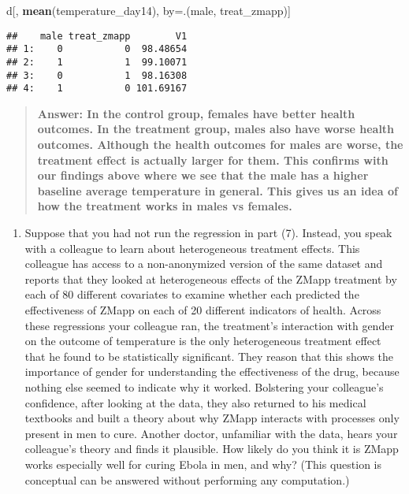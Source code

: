 \documentclass[
]{article}
\newenvironment{Shaded}{\begin{snugshade}}{\end{snugshade}}
\newcommand{\KeywordTok}[1]{\textcolor[rgb]{0.13,0.29,0.53}{\textbf{#1}}}
\newcommand{\NormalTok}[1]{#1}
\providecommand{\tightlist}{%
  \setlength{\itemsep}{0pt}\setlength{\parskip}{0pt}}
\begin{document}
\begin{Shaded}
\begin{Highlighting}[]
\NormalTok{d[, }\KeywordTok{mean}\NormalTok{(temperature_day14), by=.(male, treat_zmapp)]}
\end{Highlighting}
\end{Shaded}

\begin{verbatim}
##    male treat_zmapp        V1
## 1:    0           0  98.48654
## 2:    1           1  99.10071
## 3:    0           1  98.16308
## 4:    1           0 101.69167
\end{verbatim}

\begin{quote}
\textbf{Answer: In the control group, females have better health
outcomes. In the treatment group, males also have worse health outcomes.
Although the health outcomes for males are worse, the treatment effect
is actually larger for them. This confirms with our findings above where
we see that the male has a higher baseline average temperature in
general. This gives us an idea of how the treatment works in males vs
females. }
\end{quote}

\begin{enumerate}
\def\labelenumi{\arabic{enumi}.}
\setcounter{enumi}{7}
\tightlist
\item
  Suppose that you had not run the regression in part (7). Instead, you
  speak with a colleague to learn about heterogeneous treatment effects.
  This colleague has access to a non-anonymized version of the same
  dataset and reports that they looked at heterogeneous effects of the
  ZMapp treatment by each of 80 different covariates to examine whether
  each predicted the effectiveness of ZMapp on each of 20 different
  indicators of health. Across these regressions your colleague ran, the
  treatment's interaction with gender on the outcome of temperature is
  the only heterogeneous treatment effect that he found to be
  statistically significant. They reason that this shows the importance
  of gender for understanding the effectiveness of the drug, because
  nothing else seemed to indicate why it worked. Bolstering your
  colleague's confidence, after looking at the data, they also returned
  to his medical textbooks and built a theory about why ZMapp interacts
  with processes only present in men to cure. Another doctor, unfamiliar
  with the data, hears your colleague's theory and finds it plausible.
  How likely do you think it is ZMapp works especially well for curing
  Ebola in men, and why? (This question is conceptual can be answered
  without performing any computation.)
\end{enumerate}
\end{document}
